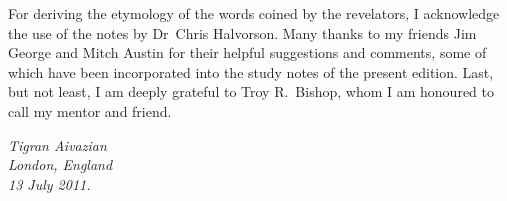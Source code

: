 For deriving the etymology of the words coined by the revelators, I acknowledge the use of the notes by Dr~Chris Halvorson.
Many thanks to my friends Jim George and Mitch Austin for their helpful suggestions and comments,
some of which have been incorporated into the study notes of the present edition.
Last, but not least, I am deeply grateful to Troy R.~Bishop, whom I am honoured to call my mentor and friend.


\begin{flushleft}
\itshape
\hspace*{6pt}Tigran Aivazian\\
\hspace*{6pt}London, England\\
\hspace*{6pt}13 July 2011.\\
\end{flushleft}
